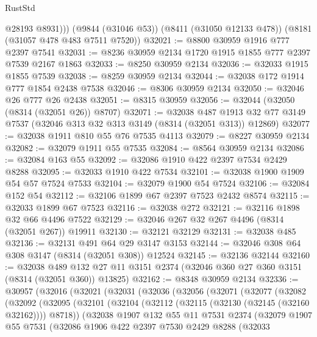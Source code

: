 \begin{lexlean}{RustStd}
\begin{coremodule}
          @28193
          @8931)))
    (@9844 (@31046 @53))
    (@8411 (@31050 @12133 @478))
    (@8181 (@31057 @478 @483 @7511 @7520))
@32021 := @8800 @30959 @1916 @777 @2397 @7541
@32031 := @8236 @30959 @2134 @1720 @1915 @1855 @777 @2397 @7539 @2167 @1863
@32033 := @8250 @30959 @2134
@32036 := @32033 @1915 @1855 @7539
@32038 := @8259 @30959 @2134
@32044 := @32038 @172 @1914 @777 @1854 @2438 @7538
@32046 := @8306 @30959 @2134
@32050 := @32046 @26 @777 @26 @2438
@32051 := @8315 @30959
@32056 := @32044 (@32050 (@8314 (@32051 @26)) @8707)
@32071 := @32038
    @487
    @1913
    @32
    @77
    @3149
    @7537
    (@32046 @313 @32 @313 @3149 (@8314 (@32051 @313)) @12869)
@32077 := @32038 @1911 @810 @55 @76 @7535 @4113
@32079 := @8227 @30959 @2134
@32082 := @32079 @1911 @55 @7535
@32084 := @8564 @30959 @2134
@32086 := @32084 @163 @55
@32092 := @32086 @1910 @422 @2397 @7534 @2429 @8288
@32095 := @32033 @1910 @422 @7534
@32101 := @32038 @1900 @1909 @54 @57 @7524 @7533
@32104 := @32079 @1900 @54 @7524
@32106 := @32084 @152 @54
@32112 := @32106 @1899 @67 @2397 @7523 @2432 @8574
@32115 := @32033 @1899 @67 @7523
@32116 := @32038 @272
@32121 := @32116 @1898 @32 @66 @4496 @7522
@32129 := @32046 @267 @32 @267 @4496 (@8314 (@32051 @267)) @19911
@32130 := @32121 @32129
@32131 := @32038 @485
@32136 := @32131 @491 @64 @29 @3147 @3153
@32144 := @32046 @308 @64 @308 @3147 (@8314 (@32051 @308)) @12524
@32145 := @32136 @32144
@32160 := @32038
    @489
    @132
    @27
    @11
    @3151
    @2374
    (@32046 @360 @27 @360 @3151 (@8314 (@32051 @360)) @13825)
@32162 := @8348 @30959 @2134
@32336 := @30957
    (@32016
      (@32021
        (@32031
          (@32036
            (@32056
              (@32071
                (@32077
                  (@32082
                    (@32092
                      (@32095
                        (@32101
                          (@32104 (@32112 (@32115 (@32130 (@32145 (@32160 @32162)))) @8718))
                          (@32038
                            @1907
                            @132
                            @55
                            @11
                            @7531
                            @2374
                            (@32079
                              @1907
                              @55
                              @7531
                              (@32086
                                @1906
                                @422
                                @2397
                                @7530
                                @2429
                                @8288
                                (@32033

\end{coremodule}
\end{lexlean}
